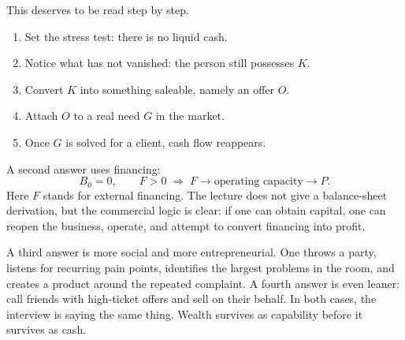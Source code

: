 This deserves to be read step by step.

\begin{enumerate}
\item Set the stress test: there is no liquid cash.
\item Notice what has not vanished: the person still possesses \(K\).
\item Convert \(K\) into something saleable, namely an offer \(O\).
\item Attach \(O\) to a real need \(G\) in the market.
\item Once \(G\) is solved for a client, cash flow reappears.
\end{enumerate}

A second answer uses financing:
\begin{equation}
B_0=0,\qquad F>0 \;\Longrightarrow\; F \longrightarrow \text{operating capacity} \longrightarrow P.
\end{equation}
Here \(F\) stands for external financing. The lecture does not give a balance-sheet derivation, but the commercial logic is clear: if one can obtain capital, one can reopen the business, operate, and attempt to convert financing into profit.

A third answer is more social and more entrepreneurial. One throws a party, listens for recurring pain points, identifies the largest problems in the room, and creates a product around the repeated complaint. A fourth answer is even leaner: call friends with high-ticket offers and sell on their behalf. In both cases, the interview is saying the same thing. Wealth survives as capability before it survives as cash.

\begin{figure}
\centering
{}
\end{figure}

